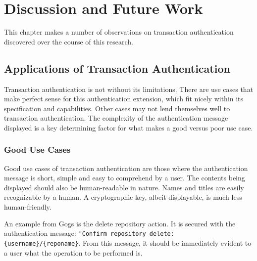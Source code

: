 
\chapter{Discussion and Future Work}\label{Chap:DiscussionAndFutureWork}

This chapter makes a number of observations on transaction authentication discovered over the course of this research. 

\section{Applications of Transaction Authentication}

Transaction authentication is not without its limitations. There are use cases that make perfect sense for this authentication extension, which fit nicely within its specification and capabilities. Other cases may not lend themselves well to transaction authentication. The complexity of the authentication message displayed is a key determining factor for what makes a good versus poor use case.



\subsection{Good Use Cases}

Good use cases of transaction authentication are those where the authentication message is short, simple and easy to comprehend by a user. The contents being displayed should also be human-readable in nature. Names and titles are easily recognizable by a human. A cryptographic key, albeit displayable, is much less human-friendly. 

An example from Gogs is the delete repository action. It is secured with the authentication message: \lstinline|"Confirm repository delete: {username}/{reponame}|. From this message, it should be immediately evident to a user what the operation to be performed is. 

